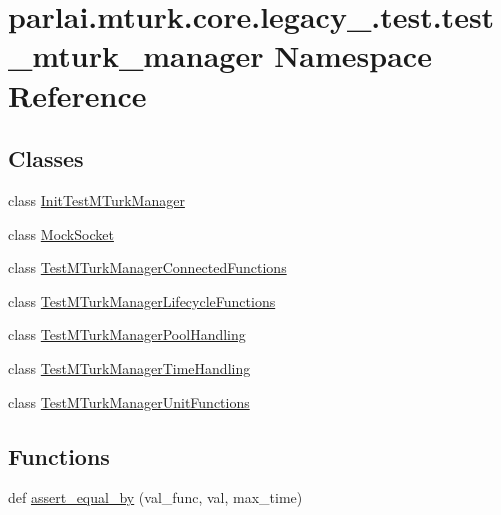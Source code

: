 \hypertarget{namespaceparlai_1_1mturk_1_1core_1_1legacy__2018_1_1test_1_1test__mturk__manager}{}\section{parlai.\+mturk.\+core.\+legacy\+\_.\+test.\+test\+\_\+mturk\+\_\+manager Namespace Reference}
\label{namespaceparlai_1_1mturk_1_1core_1_1legacy__2018_1_1test_1_1test__mturk__manager}
\subsection*{Classes}
\begin{DoxyCompactItemize}
\item 
class \hyperlink{classparlai_1_1mturk_1_1core_1_1legacy__2018_1_1test_1_1test__mturk__manager_1_1InitTestMTurkManager}{Init\+Test\+M\+Turk\+Manager}
\item 
class \hyperlink{classparlai_1_1mturk_1_1core_1_1legacy__2018_1_1test_1_1test__mturk__manager_1_1MockSocket}{Mock\+Socket}
\item 
class \hyperlink{classparlai_1_1mturk_1_1core_1_1legacy__2018_1_1test_1_1test__mturk__manager_1_1TestMTurkManagerConnectedFunctions}{Test\+M\+Turk\+Manager\+Connected\+Functions}
\item 
class \hyperlink{classparlai_1_1mturk_1_1core_1_1legacy__2018_1_1test_1_1test__mturk__manager_1_1TestMTurkManagerLifecycleFunctions}{Test\+M\+Turk\+Manager\+Lifecycle\+Functions}
\item 
class \hyperlink{classparlai_1_1mturk_1_1core_1_1legacy__2018_1_1test_1_1test__mturk__manager_1_1TestMTurkManagerPoolHandling}{Test\+M\+Turk\+Manager\+Pool\+Handling}
\item 
class \hyperlink{classparlai_1_1mturk_1_1core_1_1legacy__2018_1_1test_1_1test__mturk__manager_1_1TestMTurkManagerTimeHandling}{Test\+M\+Turk\+Manager\+Time\+Handling}
\item 
class \hyperlink{classparlai_1_1mturk_1_1core_1_1legacy__2018_1_1test_1_1test__mturk__manager_1_1TestMTurkManagerUnitFunctions}{Test\+M\+Turk\+Manager\+Unit\+Functions}
\end{DoxyCompactItemize}
\subsection*{Functions}
\begin{DoxyCompactItemize}
\item 
def \hyperlink{namespaceparlai_1_1mturk_1_1core_1_1legacy__2018_1_1test_1_1test__mturk__manager_a169c67595e7065af1ba41705ed2dbff0}{assert\+\_\+equal\+\_\+by} (val\+\_\+func, val, max\+\_\+time)
\end{DoxyCompactItemize}
